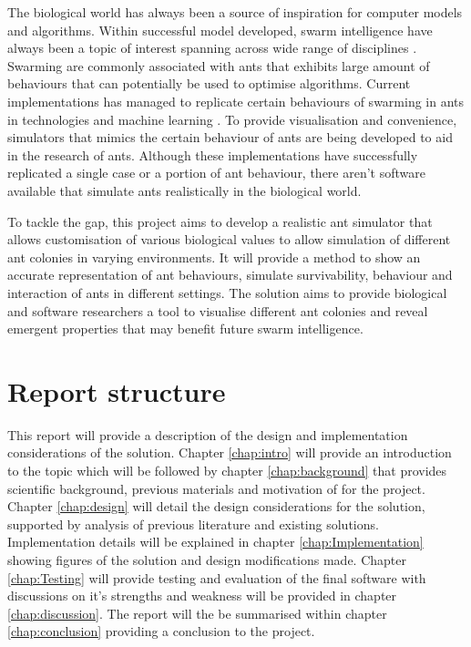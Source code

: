 \documentclass[a4paper, oneside, 11pt]{report}
\begin{document}
The biological world has always been a source of inspiration for computer models and algorithms. Within successful model developed, swarm intelligence have always been a topic of interest spanning across wide range of disciplines \citep{Swarm_Intro}. Swarming are commonly associated with ants that exhibits large amount of behaviours that can potentially be used to optimise algorithms. Current implementations has managed to replicate certain behaviours of swarming in ants in technologies \citep{Ant_Implementation_Tech_1} \citep{Ant_Implementation_Tech_2} and machine learning \citep{Ant_Implementation_ML}. To provide visualisation and convenience, simulators \citep{Ant_Simulator} \citep{Ant_Simulator_Revisited} \citep{Ant_Simulator_Intro}  that mimics the certain behaviour of ants are being developed to aid in the research of ants. Although these implementations have successfully replicated a single case or a portion of ant behaviour, there aren't software available that simulate ants realistically in the biological world.

To tackle the gap, this project aims to develop a realistic ant simulator that allows customisation of various biological values to allow simulation of different ant colonies in varying environments. It will provide a method to show an accurate representation of ant behaviours, simulate survivability, behaviour and interaction of ants in different settings. The solution aims to provide biological and software researchers a tool to visualise different ant colonies and reveal emergent properties that may benefit future swarm intelligence.

\section{Report structure}
This report will provide a description of the design and implementation considerations of the solution. Chapter \ref{chap:intro} will provide an introduction to the topic which will be followed by chapter \ref{chap:background} that provides scientific background, previous materials and motivation of for the project. Chapter \ref{chap:design} will detail the design considerations for the solution, supported by analysis of previous literature and existing solutions. Implementation details will be explained in chapter \ref{chap:Implementation} showing figures of the solution and design modifications made. Chapter \ref{chap:Testing} will provide testing and evaluation of the final software with discussions on it's strengths and weakness will be provided in chapter \ref{chap:discussion}. The report will the be summarised within chapter \ref{chap:conclusion} providing a conclusion to the project.
\end{document}
